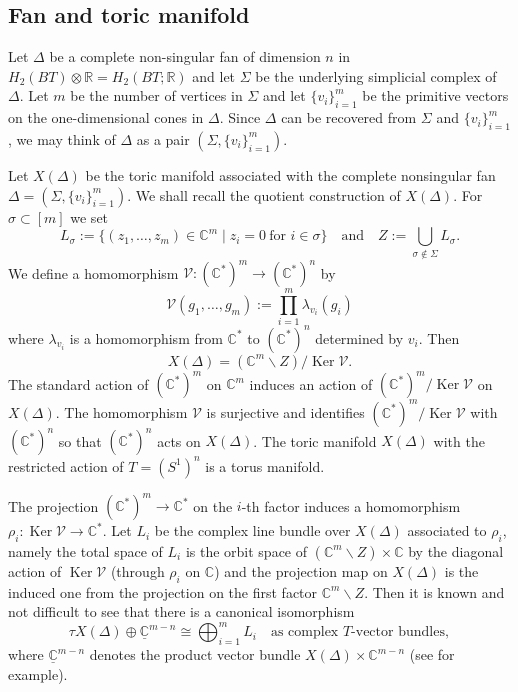 \documentclass[12pt]{amsart}
\theoremstyle{plain} \numberwithin{equation}{section}
\theoremstyle{definition}
\def\C{\mathbb C}
\def\R{\mathbb R}
\DeclareMathOperator{\Ker}{Ker}
\begin{document}
\subsection{Fan and toric manifold} 
Let $\Delta$ be a complete non-singular fan of dimension $n$ in $H_2(BT)\otimes\R=H_2(BT;\R)$ and let $\Sigma$ be the underlying simplicial complex of $\Delta$.  Let $m$ be the number of vertices in $\Sigma$ and let $\{v_i\}_{i=1}^m$ be the primitive vectors on the one-dimensional cones in $\Delta$.  Since $\Delta$ can be recovered from $\Sigma$ and $\{v_i\}_{i=1}^m$, we may think of $\Delta$ as a pair $(\Sigma,\{v_i\}_{i=1}^m)$. 

Let $X(\Delta)$ be the toric manifold associated with the complete nonsingular fan $\Delta=(\Sigma,\{v_i\}_{i=1}^m)$.  
We shall recall the quotient construction of $X(\Delta)$.  
For $\sigma\subset [m]$ we set 
\[
L_\sigma:=\{(z_1,\dots,z_m)\in\C^m\mid z_i=0\ \text{for $i\in\sigma$}\}\quad\text{and}\quad Z:=\bigcup_{\sigma\notin\Sigma}L_\sigma.
\]
We define a homomorphism $\mathcal V\colon (\C^*)^m\to (\C^*)^n$ by 
\[
\mathcal V(g_1,\dots,g_m):=\prod_{i=1}^m\lambda_{v_i}(g_i)
\]
where $\lambda_{v_i}$ is a homomorphism from $\C^*$ to $(\C^*)^n$ determined by $v_i$.  %
Then 
\[
X(\Delta)=(\C^m\backslash Z)/\Ker\mathcal V.
\]
The standard action of $(\C^*)^m$ on $\C^m$ induces an action of $(\C^*)^m/\Ker\mathcal V$ on $X(\Delta)$.  The homomorphism $\mathcal V$ is surjective and identifies $(\C^*)^m/\Ker\mathcal V$ with $(\C^*)^n$ so that $(\C^*)^n$ acts on $X(\Delta)$.  
The toric manifold $X(\Delta)$ with the restricted action of $T=(S^1)^n$ is a torus manifold.   

The projection $(\C^*)^m\to \C^*$ on the $i$-th factor induces a homomorphism $\rho_i\colon \Ker\mathcal V\to \C^*$.  Let $L_i$ be the complex line bundle over $X(\Delta)$ associated to $\rho_i$, namely the total space of $L_i$ is the orbit space of $(\C^m\backslash Z)\times\C$ by the diagonal action of $\Ker\mathcal V$ (through $\rho_i$ on $\C$) and the projection map on $X(\Delta)$ is the induced one from the projection on the first factor $\C^m\backslash Z$.  Then it is known and not difficult to see that there is a canonical isomorphism 
\begin{equation} \label{eq:6-1}
\tau X(\Delta)\oplus \underline{\C}^{m-n}\cong \bigoplus_{i=1}^mL_i \quad\text{as complex $T$-vector bundles},
\end{equation}
where $\underline{\C}^{m-n}$ denotes the product vector bundle $X(\Delta)\times\C^{m-n}$ (see \cite[Theorem 6.5]{is-fu-ma13} for example).    
\end{document}
